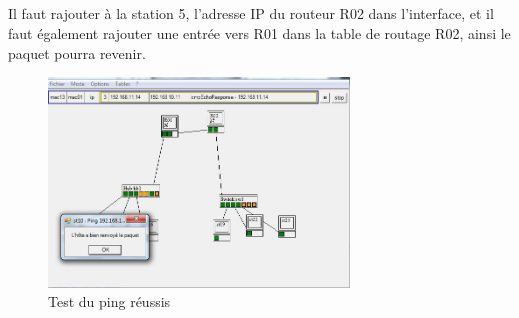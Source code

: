 \documentclass[a4paper, 11pt]{article}
\begin{document}
		\subsection{}
		Il faut rajouter à la station 5, l'adresse IP du routeur R02 dans l'interface, et il
		faut également rajouter une entrée vers R01 dans la table de routage R02, ainsi le
		paquet pourra revenir.
		\begin{figure}[H]
			\centering
			\includegraphics[width=8cm]{7.jpg}
			\caption{Test du ping réussis}
		\end{figure}
\end{document}
